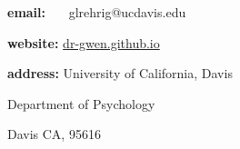 %
%
\noindent\textbf{email:} ~~~glrehrig@ucdavis.edu


\noindent\textbf{website:} \href{https://dr-gwen.github.io/}{dr-gwen.github.io}


\noindent\textbf{address:} University of California, Davis

\indent \hphantom{~~~~~~~~} Department of Psychology


\indent \hphantom{~~~~~~~~} Davis CA, 95616

